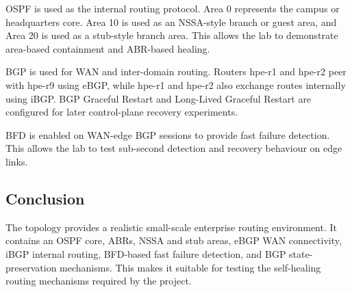 OSPF is used as the internal routing protocol. Area 0 represents the campus or headquarters core. Area 10 is used as an NSSA-style branch or guest area, and Area 20 is used as a stub-style branch area. This allows the lab to demonstrate area-based containment and ABR-based healing.

BGP is used for WAN and inter-domain routing. Routers hpe-r1 and hpe-r2 peer with hpe-r9 using eBGP, while hpe-r1 and hpe-r2 also exchange routes internally using iBGP. BGP Graceful Restart and Long-Lived Graceful Restart are configured for later control-plane recovery experiments.

BFD is enabled on WAN-edge BGP sessions to provide fast failure detection. This allows the lab to test sub-second detection and recovery behaviour on edge links.

\subsection{Conclusion}

The topology provides a realistic small-scale enterprise routing environment. It contains an OSPF core, ABRs, NSSA and stub areas, eBGP WAN connectivity, iBGP internal routing, BFD-based fast failure detection, and BGP state-preservation mechanisms. This makes it suitable for testing the self-healing routing mechanisms required by the project.
